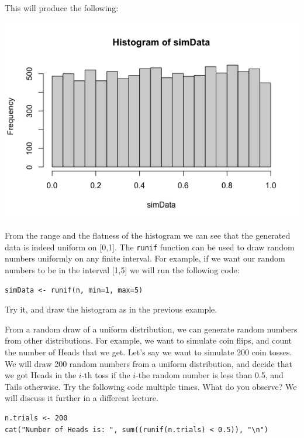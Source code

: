 \documentclass[11pt]{article}
\theoremstyle{definition}
\begin{document}
This will produce the following:
\begin{center}
\includegraphics[scale=0.3]{Note01HistUnif.png}
\end{center}
From the range and the flatness of the histogram we can see that the generated data is indeed uniform on [0,1]. The \texttt{runif} function can be used to draw random numbers uniformly on any finite interval. For example, if we want our random numbers to be in the interval [1,5] we will run the following code:
\begin{verbatim}
simData <- runif(n, min=1, max=5)
\end{verbatim}
Try it, and draw the histogram as in the previous example.

From a random draw of a uniform distribution, we can generate random numbers from other distributions. For example, we want to simulate coin flips, and count the number of Heads that we get. Let's say we want to simulate 200 coin tosses. We will draw 200 random numbers from a uniform distribution, and decide that we got Heads in the $i$-th toss if the $i$-the random number is less than 0.5, and Tails otherwise.
Try the following code multiple times. What do you observe? We will discuss it further in a different lecture.
\begin{verbatim}
n.trials <- 200
cat("Number of Heads is: ", sum((runif(n.trials) < 0.5)), "\n")
\end{verbatim}
\end{document}

